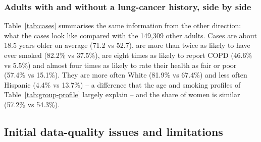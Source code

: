 \subsubsection{Adults with and without a lung-cancer history, side by side}\label{sec:sidebyside}

Table~\ref{tab:cases} summarises the same information from the other direction: what the \nCases cases look like compared with the 149,309 other adults. Cases are about 18.5 years older on average (71.2 vs 52.7), are more than twice as likely to have ever smoked (82.2\% vs 37.5\%), are eight times as likely to report COPD (46.6\% vs 5.5\%) and almost four times as likely to rate their health as fair or poor (57.4\% vs 15.1\%). They are more often White (81.9\% vs 67.4\%) and less often Hispanic (4.4\% vs 13.7\%) -- a difference that the age and smoking profiles of Table~\ref{tab:group-profile} largely explain -- and the share of women is similar (57.2\% vs 54.3\%).

\begin{table}[htbp]
\centering\small
\caption{Characteristics of adults with and without a lung-cancer history (unweighted; percentages among adults with a known answer). Source: \texttt{cases\_vs\_noncases.csv}.}\label{tab:cases}

\end{table}

\subsection{Initial data-quality issues and limitations}\label{sec:quality}

